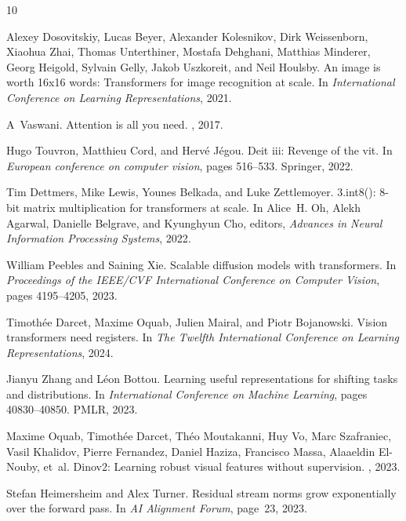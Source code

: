 \documentclass[conference]{IEEEtran}
\begin{document}

\begin{thebibliography}{10}

Alexey Dosovitskiy, Lucas Beyer, Alexander Kolesnikov, Dirk Weissenborn, Xiaohua Zhai, Thomas Unterthiner, Mostafa Dehghani, Matthias Minderer, Georg Heigold, Sylvain Gelly, Jakob Uszkoreit, and Neil Houlsby.
\newblock An image is worth 16x16 words: Transformers for image recognition at scale.
\newblock In {\em International Conference on Learning Representations}, 2021.

A~Vaswani.
\newblock Attention is all you need.
, 2017.

Hugo Touvron, Matthieu Cord, and Herv{\'e} J{\'e}gou.
\newblock Deit iii: Revenge of the vit.
\newblock In {\em European conference on computer vision}, pages 516--533. Springer, 2022.

Tim Dettmers, Mike Lewis, Younes Belkada, and Luke Zettlemoyer.
3.int8(): 8-bit matrix multiplication for transformers at scale.
\newblock In Alice~H. Oh, Alekh Agarwal, Danielle Belgrave, and Kyunghyun Cho, editors, {\em Advances in Neural Information Processing Systems}, 2022.

William Peebles and Saining Xie.
\newblock Scalable diffusion models with transformers.
\newblock In {\em Proceedings of the IEEE/CVF International Conference on Computer Vision}, pages 4195--4205, 2023.

Timoth{\'e}e Darcet, Maxime Oquab, Julien Mairal, and Piotr Bojanowski.
\newblock Vision transformers need registers.
\newblock In {\em The Twelfth International Conference on Learning Representations}, 2024.

Jianyu Zhang and L{\'e}on Bottou.
\newblock Learning useful representations for shifting tasks and distributions.
\newblock In {\em International Conference on Machine Learning}, pages 40830--40850. PMLR, 2023.

Maxime Oquab, Timoth{\'e}e Darcet, Th{\'e}o Moutakanni, Huy Vo, Marc Szafraniec, Vasil Khalidov, Pierre Fernandez, Daniel Haziza, Francisco Massa, Alaaeldin El-Nouby, et~al.
\newblock Dinov2: Learning robust visual features without supervision.
, 2023.

Stefan Heimersheim and Alex Turner.
\newblock Residual stream norms grow exponentially over the forward pass.
\newblock In {\em AI Alignment Forum}, page~23, 2023.


\end{thebibliography}
\end{document}

